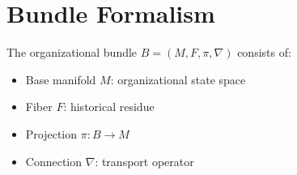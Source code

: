 \section{Bundle Formalism}
\label{app:bundle}


The organizational bundle $B = (M, F, \pi, \nabla)$ consists of:
\begin{itemize}
\item Base manifold $M$: organizational state space
\item Fiber $F$: historical residue
\item Projection $\pi: B \to M$
\item Connection $\nabla$: transport operator
\end{itemize}
